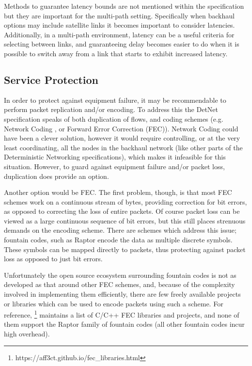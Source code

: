Methods to guarantee latency bounds are not mentioned within the specification but they are important for the multi-path setting. Specifically when backhaul options may include satellite links it becomes important to consider latencies. Additionally, in a multi-path environment, latency can be a useful criteria for selecting between links, and guaranteeing delay becomes easier to do when it is possible to switch away from a link that starts to exhibit increased latency.

\subsection{Service Protection}

In order to protect against equipment failure, it may be recommendable to perform packet replication and/or encoding. To address this the DetNet specification speaks of both duplication of flows, and coding schemes (e.g. Network Coding \cite{ahlswede2000network}, or Forward Error Correction (FEC)). Network Coding could have been a clever solution, however it would require controlling, or at the very least coordinating, all the nodes in the backhaul network (like other parts of the Deterministic Networking specifications), which makes it infeasible for this situation. However, to guard against equipment failure and/or packet loss, duplication does provide an option.

Another option would be FEC. The first problem, though, is that most FEC schemes work on a continuous stream of bytes, providing correction for bit errors, as opposed to correcting the loss of entire packets. Of course packet loss can be viewed as a large continuous sequence of bit errors, but this still places strenuous demands on the encoding scheme. There are schemes which address this issue; fountain codes, such as Raptor \cite{luby2007raptor} encode the data as multiple discrete symbols. These symbols can be mapped directly to packets, thus protecting against packet loss as opposed to just bit errors.

Unfortunately the open source ecosystem surrounding fountain codes is not as developed as that around other FEC schemes, and, because of the complexity involved in implementing them efficiently, there are few freely available projects or libraries which can be used to encode packets using such a scheme. For reference, \footnote{https://aff3ct.github.io/fec\_libraries.html} maintains a list of C/C++ FEC libraries and projects, and none of them support the Raptor family of fountain codes (all other fountain codes incur high overhead).

